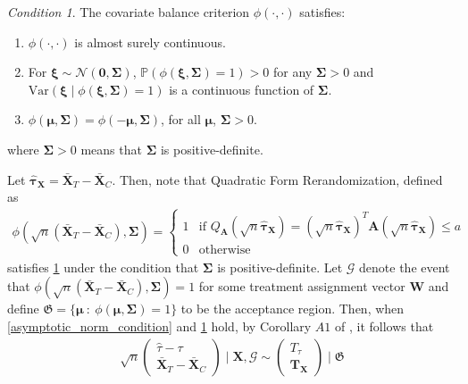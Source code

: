 \documentclass[11pt,twoside]{article}
\theoremstyle{definition}
\theoremstyle{remark}
\newtheorem{condition}{Condition}
\begin{document}
\begin{condition} \label{general_balance_condition} The covariate balance criterion $\phi(\cdot, \cdot)$ satisfies:
    \begin{enumerate}
    \item[(i)] $\phi(\cdot, \cdot)$ is almost surely continuous.
    \item[(ii)] For $\bm{\xi} \sim \mathcal{N}(\mathbf{0}, \mathbf{\Sigma})$, $\mathbb{P}(\phi(\bm{\xi}, \mathbf{\Sigma}) = 1) > 0$ for any $\mathbf{\Sigma} > 0$ and $\text{Var}(\bm{\xi} \mid \phi(\bm{\xi}, \mathbf{\Sigma}) = 1)$ is a continuous function of $\mathbf{\Sigma}$.
    \item[(iii)] $\phi(\bm{\mu}, \mathbf{\Sigma}) = \phi(- \bm{\mu},\mathbf{\Sigma})$, for all $\bm{\mu}$, $\mathbf{\Sigma} > 0$.
\end{enumerate}
where $\mathbf{\Sigma} > 0$ means that $\mathbf{\Sigma}$ is positive-definite.
\end{condition}
Let $\widehat{\bm{\tau}}_{\mathbf{X}} = \bar{\mathbf{X}}_T - \bar{\mathbf{X}}_C$. Then, note that Quadratic Form Rerandomization, defined as
\begin{align*}
    \phi(\sqrt{n}(\bar{\mathbf{X}}_T - \bar{\mathbf{X}}_C), \mathbf{\Sigma}) = \begin{cases}
        1 & \text{if $Q_{\mathbf{A}}(\sqrt{n} \widehat{\bm{\tau}}_{\mathbf{X}}) = (\sqrt{n} \widehat{\bm{\tau}}_{\mathbf{X}})^T \mathbf{A} (\sqrt{n} \widehat{\bm{\tau}}_{\mathbf{X}}) \leq a$} \\
        0 & \text{otherwise}
    \end{cases}
\end{align*}
satisfies \cref{general_balance_condition} under the condition that $\mathbf{\Sigma}$ is positive-definite. Let $\mathcal{G}$ denote the event that $\phi(\sqrt{n}(\bar{\mathbf{X}}_T - \bar{\mathbf{X}}_C), \mathbf{\Sigma}) = 1$ for some treatment assignment vector $\mathbf{W}$ and define $\mathfrak{G} = \{ \bm{\mu} \ : \ \phi(\bm{\mu}, \mathbf{\Sigma}) = 1 \}$ to be the acceptance region. Then, when \cref{asymptotic_norm_condition} and \cref{general_balance_condition} hold, by Corollary $A1$ of \cite{li2018asymptotic}, it follows that
\begin{align*}
    \sqrt{n}\begin{pmatrix}
        \widehat{\tau} - \tau \\
        \bar{\mathbf{X}}_T - \bar{\mathbf{X}}_C
    \end{pmatrix} \mid \mathbf{X}, \mathcal{G} \sim \begin{pmatrix}
        T_\tau \\
        \mathbf{T}_{\mathbf{X}}
    \end{pmatrix} \mid \mathfrak{G}
\end{align*}
\end{document}
